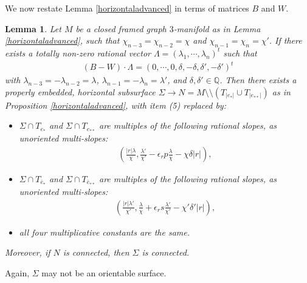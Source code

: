 \documentclass{amsart}
\numberwithin{equation}{section}
\newtheorem{lemma}[theorem]{Lemma}
\theoremstyle{definition}
\begin{document}
We now restate Lemma \ref{horizontaladvanced} in terms of matrices $B$ and $W$.

\begin{lemma}\label{horizontaladvanced2}
Let $M$ be a closed framed graph $3$-manifold as in Lemma \ref{horizontaladvanced}, such that $\chi_{n-3}=\chi_{n-2}=\chi$ and $\chi_{n-1}=\chi_n=\chi'$. If there exists a totally non-zero rational vector $\Lambda=(\lambda_1,\cdots, \lambda_n)^t$ such that 
\begin{align}\label{5.8}
(B-W)\cdot \Lambda=
(0, \cdots, 0, \delta, -\delta, \delta', -\delta')^t
\end{align}
with $\lambda_{n-3}=-\lambda_{n-2}=\lambda$, $\lambda_{n-1}=-\lambda_n=\lambda'$, and $\delta,\delta'\in \mathbb{Q}$. Then there exists a properly embedded, horizontal subsurface $\Sigma\to N=M\setminus\setminus (T_{|e_*|}\cup T_{|e_{**}|})$ as in Proposition \ref{horizontaladvanced}, with item (5) replaced by: 
\begin{itemize}
\item $\Sigma\cap T_{e_*}$ and $\Sigma\cap T_{e_{**}}$ are multiples of the following rational slopes, as unoriented multi-slopes:
\begin{align}\label{5.9}
(\frac{|r|\lambda}{\chi},\frac{\lambda'}{\chi'}-\epsilon_r p\frac{\lambda}{\chi}-\chi \delta|r|),
\end{align}
\item $\Sigma\cap T_{\bar{e}_*}$ and $\Sigma\cap T_{\bar{e}_{**}}$ are multiples of the following rational slopes, as unoriented multi-slopes:
\begin{align}\label{5.10}
(\frac{|r|\lambda'}{\chi'},\frac{\lambda}{\chi}+\epsilon_r s\frac{\lambda'}{\chi'}-\chi'\delta'|r|),
\end{align}
\item all four multiplicative constants are the same.
\end{itemize}

Moreover, if $N$ is connected, then $\Sigma$ is connected.
\end{lemma}

Again, $\Sigma$ may not be an orientable surface.
\end{document}

